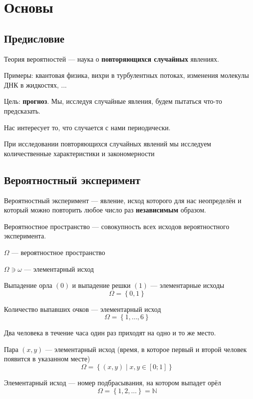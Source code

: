 \chapter{Основы}

\section{Предисловие}
Теория вероятностей --- наука о \textbf{повторяющихся случайных} явлениях.

Примеры: квантовая физика, вихри в турбулентных потоках,
изменения молекулы ДНК в жидкостях, ...

Цель: \textbf{прогноз}. Мы, исследуя случайные явления,
будем пытаться что-то предсказать.

Нас интересует то, что случается с нами периодически.

При исследовании повторяющихся случайных явлений мы исследуем
количественные характеристики и закономерности

\section{Вероятностный эксперимент}
\begin{definition}
Вероятностный эксперимент --- явление, исход которого для нас неопределён
и который можно повторить любое число раз \textbf{независимым} образом.
\end{definition}
\begin{definition}
Вероятностное пространство --- совокупность всех исходов
вероятностного эксперимента.
\end{definition}
$\Omega$ --- вероятностное пространство

$\Omega \ni \omega$ --- элементарный исход

\begin{example}
Выпадение орла $\left( 0 \right)$
и выпадение решки $\left( 1 \right)$ --- элементарные исходы
$$\Omega = \left\{ 0, 1 \right\}$$
\end{example}
\begin{example}
Количество выпавших очков --- элементарный исход
$$\Omega = \left\{ 1, \dots, 6 \right\}$$
\end{example}
\begin{example}
Два человека в течение часа один раз приходят на одно и то же место.

Пара $\left( x,y \right)$ --- элементарный исход
(время, в которое первый и второй человек появится в указанном месте)
$$\Omega = \left\{ \left(x,y\right) \mid x,y \in [0;1] \right\}$$
\end{example}
\begin{example}
    Элементарный исход --- номер подбрасывания, на котором выпадет орёл
$$\Omega = \left\{ 1,2, \dots \right\} =  \mathbb{N}$$
\end{example}
